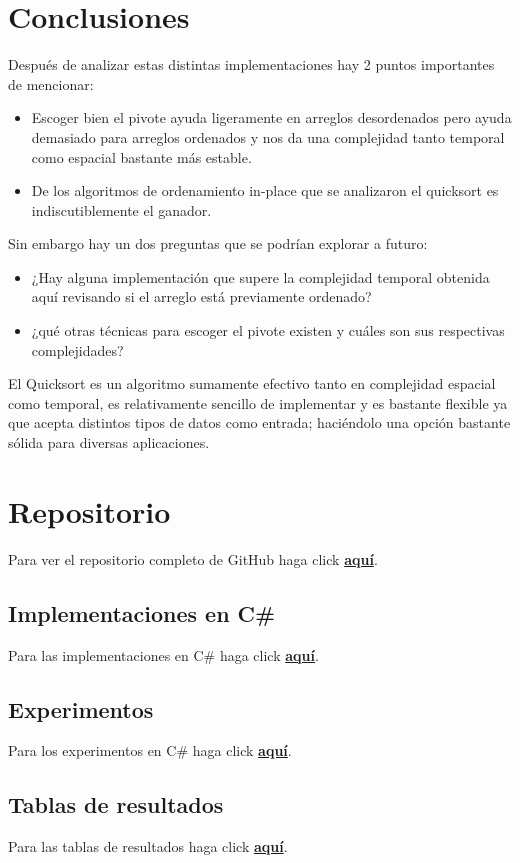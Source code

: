 \documentclass[conference]{IEEEtran}
\begin{document}
\section{Conclusiones}

Después de analizar estas distintas implementaciones hay 2 puntos importantes de mencionar:

\begin{itemize}
    \item Escoger bien el pivote ayuda ligeramente en arreglos desordenados pero ayuda demasiado para arreglos ordenados y nos da una complejidad tanto temporal como espacial bastante más estable.
    \item De los algoritmos de ordenamiento in-place que se analizaron el quicksort es indiscutiblemente el ganador.
\end{itemize}

Sin embargo hay un dos preguntas que se podrían explorar a futuro:
\begin{itemize}
    \item ¿Hay alguna implementación que supere la complejidad temporal obtenida aquí revisando si el arreglo está previamente ordenado? 
    \item ¿qué otras técnicas para escoger el pivote existen y cuáles son sus respectivas complejidades?
\end{itemize}

El Quicksort es un algoritmo sumamente efectivo tanto en complejidad espacial como temporal, 
es relativamente sencillo de implementar y es bastante flexible ya que acepta distintos tipos de datos como entrada; 
haciéndolo una opción bastante sólida para diversas aplicaciones.





\appendices
\section{Repositorio}
Para ver el repositorio completo de GitHub haga click \href{https://github.com/PabloNatB/Comparativa-Quicksort}{\textbf{aquí}}.

\subsection{Implementaciones en C\#}
Para las implementaciones en C\# haga click \href{https://github.com/PabloNatB/Comparativa-Quicksort/blob/main/Qsort/Class1.cs}{\textbf{aquí}}.

\subsection{Experimentos}
Para los experimentos en C\# haga click \href{https://github.com/PabloNatB/Comparativa-Quicksort/blob/main/Qsort/Program.cs}{\textbf{aquí}}.

\subsection{Tablas de resultados}
Para las tablas de resultados haga click \href{https://github.com/PabloNatB/Comparativa-Quicksort/tree/main/Qsort/bin/Debug/net8.0}{\textbf{aquí}}.
\end{document}
